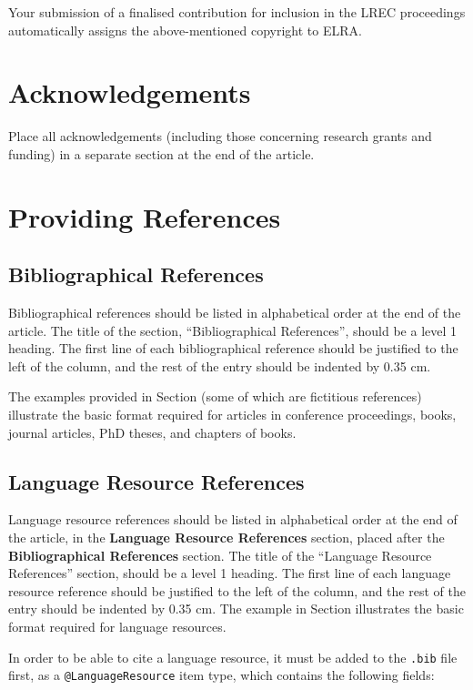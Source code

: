 \documentclass[10pt, a4paper]{article}
\newcommand{\secref}[1]{\StrSubstitute{\getrefnumber{#1}}{.}{ }}
\begin{document}
Your submission of a finalised contribution for inclusion in the LREC
proceedings automatically assigns the above-mentioned copyright to ELRA.


\section{Acknowledgements}

Place all acknowledgements (including those concerning research grants and
funding) in a separate section at the end of the article.

\section{Providing References}

\subsection{Bibliographical References}
Bibliographical references should be listed in alphabetical order at the
end of the article. The title of the section, ``Bibliographical References'',
should be a level 1 heading. The first line of each bibliographical reference
should be justified to the left of the column, and the rest of the entry should
be indented by 0.35 cm.

The examples provided in Section \secref{main:ref} (some of which are fictitious
references) illustrate the basic format required for articles in conference
proceedings, books, journal articles, PhD theses, and chapters of books.

\subsection{Language Resource References}

Language resource references should be listed in alphabetical order at the end
of the article, in the \textbf{Language Resource References} section, placed after
the \textbf{Bibliographical References} section. The title of the ``Language Resource
References'' section, should be a level 1 heading. The first line of each
language resource reference should be justified to the left of the column, and
the rest of the entry should be indented by 0.35 cm. The example in Section 
\secref{lr:ref} illustrates the basic format required for language resources.

In order to be able to cite a language resource, it must be added to
the \texttt{.bib} file first, as a \texttt{@LanguageResource} item type, which
contains the following fields:
\end{document}
